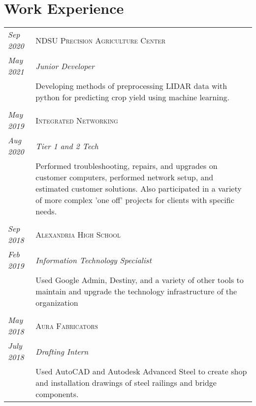 \documentclass[letterpaper,10pt]{article}
\begin{document}
\section*{Work Experience}
	\begin{tabular}{R{2cm}|p{14cm}}
	\textsl{Sep 2020}	& \textsc{NDSU Precision Agriculture Center}\\
	\textsl{May 2021}	& \emph{Junior Developer}\\
	& Developing methods of preprocessing LIDAR data with python for predicting crop yield using machine learning.\\
	\\
	\textsl{May 2019}	& \textsc{Integrated Networking}\\
	\textsl{Aug 2020}	& \emph{Tier 1 and 2 Tech}\\
	& Performed troubleshooting, repairs, and upgrades on customer computers, performed network setup, and estimated customer solutions.
	Also participated in a variety of more complex 'one off' projects for clients with specific needs.\\
	\\
	\textsl{Sep 2018}	& \textsc{Alexandria High School}\\
	\textsl{Feb 2019}	& \emph{Information Technology Specialist}\\
	& Used Google Admin, Destiny, and a variety of other tools to maintain and upgrade the technology infrastructure of the organization\\
	\\
	\textsl{May 2018}   & \textsc{Aura Fabricators}\\
	\textsl{July 2018}  & \emph{Drafting Intern}\\
	&Used AutoCAD and Autodesk Advanced Steel to create shop and installation drawings of steel railings and bridge components.\\
	\end{tabular}
\newpage
\end{document}
